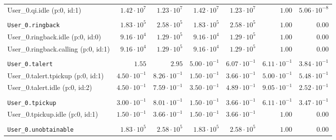 \begin{table}[htbp]
{\begin{tabular}{lrrrrrr}
\hspace{3mm}User\_0.qi.idle (p:0, id:1)              &  $1.42 \cdot 10^{7}$ &  $1.23 \cdot 10^{7}$ &  $1.42 \cdot 10^{7}$ &  $1.23 \cdot 10^{7}$ &               $1.00$ & $5.06 \cdot 10^{-8}$ \\
\\[-8pt]\texttt{User\_0.ringback}                    &  $1.83 \cdot 10^{5}$ &  $2.58 \cdot 10^{5}$ &  $1.83 \cdot 10^{5}$ &  $2.58 \cdot 10^{5}$ &               $1.00$ &               $0.00$ \\
\hspace{3mm}User\_0.ringback.idle (p:0, id:0)        &  $9.16 \cdot 10^{4}$ &  $1.29 \cdot 10^{5}$ &  $9.16 \cdot 10^{4}$ &  $1.29 \cdot 10^{5}$ &               $1.00$ &               $0.00$ \\
\hspace{3mm}User\_0.ringback.calling (p:0, id:1)     &  $9.16 \cdot 10^{4}$ &  $1.29 \cdot 10^{5}$ &  $9.16 \cdot 10^{4}$ &  $1.29 \cdot 10^{5}$ &               $1.00$ &               $0.00$ \\
\\[-8pt]\texttt{User\_0.talert}                      &               $1.55$ &               $2.95$ & $5.00 \cdot 10^{-1}$ & $6.07 \cdot 10^{-1}$ & $6.11 \cdot 10^{-1}$ & $3.84 \cdot 10^{-1}$ \\
\hspace{3mm}User\_0.talert.tpickup (p:0, id:1)       & $4.50 \cdot 10^{-1}$ & $8.26 \cdot 10^{-1}$ & $1.50 \cdot 10^{-1}$ & $3.66 \cdot 10^{-1}$ & $5.00 \cdot 10^{-1}$ & $5.48 \cdot 10^{-1}$ \\
\hspace{3mm}User\_0.talert.idle (p:0, id:2)          & $4.50 \cdot 10^{-1}$ & $7.59 \cdot 10^{-1}$ & $3.50 \cdot 10^{-1}$ & $4.89 \cdot 10^{-1}$ & $9.05 \cdot 10^{-1}$ & $2.52 \cdot 10^{-1}$ \\
\\[-8pt]\texttt{User\_0.tpickup}                     & $3.00 \cdot 10^{-1}$ & $8.01 \cdot 10^{-1}$ & $1.50 \cdot 10^{-1}$ & $3.66 \cdot 10^{-1}$ & $6.11 \cdot 10^{-1}$ & $3.47 \cdot 10^{-1}$ \\
\hspace{3mm}User\_0.tpickup.idle (p:0, id:1)         & $1.50 \cdot 10^{-1}$ & $3.66 \cdot 10^{-1}$ & $1.50 \cdot 10^{-1}$ & $3.66 \cdot 10^{-1}$ &               $1.00$ &               $0.00$ \\
\\[-8pt]\texttt{User\_0.unobtainable}                &  $1.83 \cdot 10^{5}$ &  $2.58 \cdot 10^{5}$ &  $1.83 \cdot 10^{5}$ &  $2.58 \cdot 10^{5}$ &               $1.00$ &               $0.00$ \\

\end{tabular}}
\end{table}
